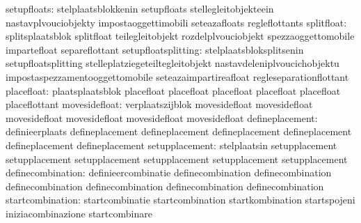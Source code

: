                      setupfloats: stelplaatsblokkenin              setupfloats
                                  stellegleitobjekteein            nastavplvouciobjekty
                                  impostaoggettimobili             seteazafloats
                                  regleflottants
                      splitfloat: splitsplaatsblok                 splitfloat
                                  teilegleitobjekt                 rozdelplvouciobjekt
                                  spezzaoggettomobile              impartefloat
                                  separeflottant
             setupfloatsplitting: stelplaatsbloksplitsenin         setupfloatsplitting
                                  stelleplatziegeteiltegleitobjekt nastavdeleniplvoucichobjektu
                                  impostaspezzamentooggettomobile  seteazaimpartireafloat
                                  regleseparationflottant
                      placefloat: plaatsplaatsblok                 placefloat
                                  placefloat                       placefloat
                                  placefloat                       placefloat
                                  placeflottant
                   movesidefloat: verplaatszijblok                 movesidefloat
                                  movesidefloat                    movesidefloat
                                  movesidefloat                    movesidefloat
                                  movesidefloat
                 defineplacement: definieerplaats                  defineplacement
                                  defineplacement                  defineplacement
                                  defineplacement                  defineplacement
                                  defineplacement
                  setupplacement: stelplaatsin                     setupplacement
                                  setupplacement                   setupplacement
                                  setupplacement                   setupplacement
                                  setupplacement
               definecombination: definieercombinatie              definecombination
                                  definecombination                definecombination
                                  definecombination                definecombination
                                  definecombination
                startcombination: startcombinatie                  startcombination
                                  startkombination                 startspojeni
                                  iniziacombinazione               startcombinare
